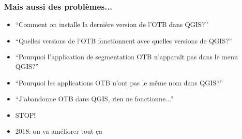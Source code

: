 \begin{frame}
\frametitle{Mais aussi des problèmes...}
\begin{itemize}
\item ``Comment on installe la dernière version de l'OTB dans QGIS?''
\item ``Quelles versions de l'OTB fonctionnent avec quelles versions de QGIS?''
\item ``Pourquoi l'application de segmentation OTB n'apparaît pas dans le menu QGIS?''
\item ``Pourquoi les applications OTB n'ont pas le même nom dans QGIS?''
\item ``J'abandonne OTB dans QGIS, rien ne fonctionne...''
\item \alert{STOP!}
\item 2018: on va améliorer tout ça
\end{itemize}

\end{frame}

